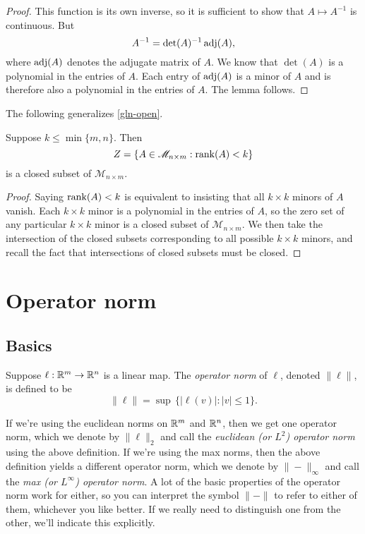 \begin{proof}
	This function is its own inverse, so it is sufficient to show that $A \mapsto A^{-1}$ is continuous. But \[ A^{-1} = \det(A)^{-1} \operatorname{adj}(A), \]
	where $\operatorname{adj}(A)$ denotes the adjugate matrix of $A$. 
	We know that $\det(A)$ is a polynomial in the entries of $A$. Each entry of $\operatorname{adj}(A)$ is a minor of $A$ and is therefore also a polynomial in the entries of $A$. The lemma follows. 
\end{proof}

The following generalizes \cref{gln-open}.

\begin{lemma}
	Suppose $k \leq \min\{m,n\}$. Then \[ Z = \{ A \in \mathscr{M}_{n \times m} : \operatorname{rank}(A) < k \} \]
	is a closed subset of $\mathscr{M}_{n \times m}$. 
\end{lemma}

\begin{proof}
	Saying $\operatorname{rank}(A) < k$ is equivalent to insisting that all $k \times k$ minors of $A$ vanish. Each $k \times k$ minor is a polynomial in the entries of $A$, so the zero set of any particular $k \times k$ minor is a closed subset of $\mathscr{M}_{n \times m}$. We then take the intersection of the closed subsets corresponding to all possible $k \times  k$ minors, and recall the fact that intersections of closed subsets must be closed.
\end{proof}

\section{Operator norm} \label{operator-norm}

\subsection{Basics} \label{operator-norm-basic}

\begin{definition} \label{operator-norm-definition} 
	Suppose $\ell : \mathbb{R}^m \to \mathbb{R}^n$ is a linear map. The \emph{operator norm} of $\ell$, denoted $\|\ell\|$, is defined to be
	\[ \|\ell\| = \sup\, \{ |\ell(v)| : |v| \leq 1 \}. \]
\end{definition} 

If we're using the euclidean norms on $\mathbb{R}^m$ and $\mathbb{R}^n$, then we get one operator norm, which we denote by $\|\ell\|_2$ and call the \emph{euclidean (or $L^2$) operator norm} using the above definition. If we're using the max norms, then the above definition yields a different operator norm, which we denote by $\|-\|_\infty$ and call the \emph{max (or $L^\infty$) operator norm}. A lot of the basic properties of the operator norm work for either, so you can interpret the symbol $\|-\|$ to refer to either of them, whichever you like better. If we really need to distinguish one from the other, we'll indicate this explicitly. 

